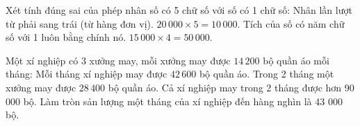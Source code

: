 \begin{ex} %
Xét tính đúng sai của phép nhân số có 5 chữ số với số có 1 chữ số:
\choiceTF
{\True Nhân lần lượt từ phải sang trái (từ hàng đơn vị).}
{$20\,000 \times 5 = 10\,000$.}
{\True Tích của số có năm chữ số với 1 luôn bằng chính nó.}
{$15\,000 \times 4 = 50\,000$.}
\end{ex}

\begin{ex} %
Một xí nghiệp có 3 xưởng may, mỗi xưởng may được $14\,200$ bộ quần áo mỗi tháng:
\choiceTF
{\True Mỗi tháng xí nghiệp may được $42\,600$ bộ quần áo.}
{\True Trong 2 tháng một xưởng may được $28\,400$ bộ quần áo.}
{Cả xí nghiệp may trong 2 tháng được hơn 90 000 bộ.}
{\True Làm tròn sản lượng một tháng của xí nghiệp đến hàng nghìn là 43 000 bộ.}
\end{ex}

